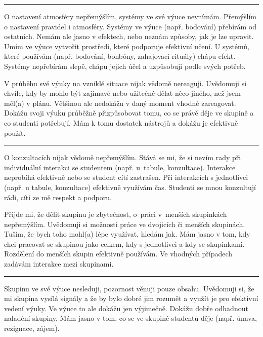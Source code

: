 \rule{\textwidth}{0.4pt}
{O nastavení atmosféry nepřemýšlím, systémy ve své výuce nevnímám.}
{Přemýšlím o nastavení pravidel i atmosféry. Systémy ve výuce (např. bodování) přebírám od ostatních. Nemám ale jasno v efektech, nebo neznám způsoby, jak je lze upravit.}
{Umím ve výuce vytvořit prostředí, které podporuje efektivní učení. U systémů, které používám (např. bodování, bonbóny, zahajovací rituály) chápu efekt. Systémy nepřebírám slepě, chápu jejich účel a uzpůsobuji podle svých potřeb.}

\newpage
{}
{V průběhu své výuky na vzniklé situace nijak vědomě nereaguji.}
{Uvědomuji si chvíle, kdy by mohlo být zajímavé nebo užitečné dělat něco jiného, než jsem měl(a) v plánu. Většinou ale nedokážu v daný moment vhodně zareagovat.}
{Dokážu svoji výuku průběžně přizpůsobovat tomu, co se právě děje ve skupině a co studenti potřebují. Mám k tomu dostatek nástrojů a dokážu je efektivně použít.}

\rule{\textwidth}{0.4pt}
{O konzultacích nijak vědomě nepřemýšlím.}
{Stává se mi, že si nevím rady při individuální interakci se studentem (např. u~tabule, konzultace). Interakce neprobíhá efektivně nebo se student cítí zastrašen.}
{Při interakcích s jednotlivci (např. u tabule, konzultace) efektivně využívám čas. Studenti se mnou konzultují rádi, cítí ze mě respekt a podporu.}

\newpage
{}
{Přijde mi, že dělit skupinu je zbytečnost, o~práci v~menších skupinkách nepřemýšlím.}
{Uvědomuji si možnosti práce ve dvojicích či menších skupinách. Tuším, že bych toho mohl(a) lépe využívat, hledám jak.}
{Mám jasno v tom, kdy chci pracovat se skupinou jako celkem, kdy s jednotlivci a kdy se skupinkami. Rozdělení do menších skupin efektivně používám. Ve vhodných případech zadávám interakce mezi skupinami.}

\rule{\textwidth}{0.4pt}
{Skupinu ve své výuce nesleduji, pozornost věnuji pouze obsahu.}
{Uvědomuji si, že mi skupina vysílá signály a že by bylo dobré jim rozumět a využít je pro efektivní vedení výuky. Ve výuce to ale dokážu jen výjimečně.}
{Dokážu dobře odhadnout naladění skupiny. Mám jasno v tom, co se ve skupině studentů děje (např. únava, rezignace, zájem).}

